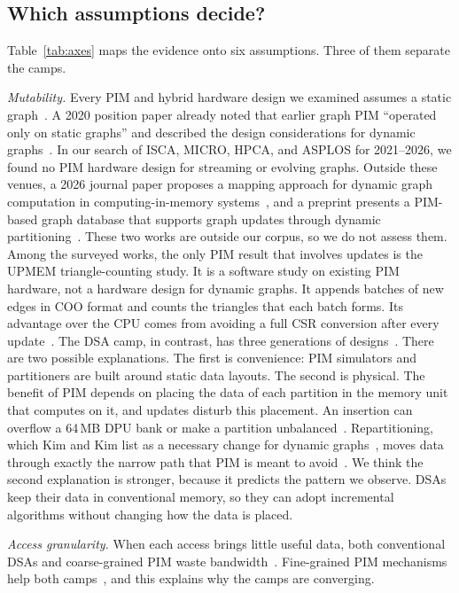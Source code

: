\documentclass[journal,onecolumn]{IEEEtran}
\begin{document}
\subsection{Which assumptions decide?}
Table~\ref{tab:axes} maps the evidence onto six assumptions. Three of them separate the camps.

\emph{Mutability.} Every PIM and hybrid hardware design we examined assumes a static graph~\cite{ahn2015tesseract,zhang2018graphp,zhuo2019graphq,song2018graphr,shin2025piccolo,shin2025fala,yenimol2026cograf}. A 2020 position paper already noted that earlier graph PIM ``operated only on static graphs'' and described the design considerations for dynamic graphs~\cite{kim2020dynamic}. In our search of ISCA, MICRO, HPCA, and ASPLOS for 2021--2026, we found no PIM hardware design for streaming or evolving graphs. Outside these venues, a 2026 journal paper proposes a mapping approach for dynamic graph computation in computing-in-memory systems~\cite{ghasemi2026dynamic}, and a preprint presents a PIM-based graph database that supports graph updates through dynamic partitioning~\cite{ma2024moctopus}. These two works are outside our corpus, so we do not assess them. Among the surveyed works, the only PIM result that involves updates is the UPMEM triangle-counting study. It is a software study on existing PIM hardware, not a hardware design for dynamic graphs. It appends batches of new edges in COO format and counts the triangles that each batch forms. Its advantage over the CPU comes from avoiding a full CSR conversion after every update~\cite{asquini2025tc}. The DSA camp, in contrast, has three generations of designs~\cite{rahman2021jetstream,zhao2022tdgraph,gao2023mega}. There are two possible explanations. The first is convenience: PIM simulators and partitioners are built around static data layouts. The second is physical. The benefit of PIM depends on placing the data of each partition in the memory unit that computes on it, and updates disturb this placement. An insertion can overflow a 64\,MB DPU bank or make a partition unbalanced~\cite{cai2024pimpam}. Repartitioning, which Kim and Kim list as a necessary change for dynamic graphs~\cite{kim2020dynamic}, moves data through exactly the narrow path that PIM is meant to avoid~\cite{gomezluna2022prim}. We think the second explanation is stronger, because it predicts the pattern we observe. DSAs keep their data in conventional memory, so they can adopt incremental algorithms without changing how the data is placed.

\emph{Access granularity.} When each access brings little useful data, both conventional DSAs and coarse-grained PIM waste bandwidth~\cite{shin2025piccolo}. Fine-grained PIM mechanisms help both camps~\cite{shin2025fala,yenimol2026cograf}, and this explains why the camps are converging.
\end{document}
